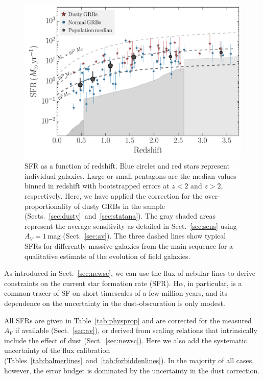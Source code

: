 \documentclass[traditabstract, longauth]{aa}
\newcommand{\ha}{H$\alpha$}
\begin{document}
\begin{figure}
\includegraphics[angle=0, width=0.99\columnwidth]{Figs/SFR_z.pdf}
\caption{SFR as a function of redshift. Blue circles and red stars represent individual galaxies. Large or small pentagons are the median values binned in redshift with bootstrapped errors at $z<2$ and $z>2$, respectively.  {Here, we have applied the correction for the over-proportionality of dusty GRBs in the sample (Sects.~\ref{sec:dusty}~and~\ref{sec:statana})}. The gray shaded areas represent the average sensitivity as detailed in Sect.~\ref{sec:sens} using $A_V=1$\,mag (Sect.~\ref{sec:av}). The three dashed lines show typical SFRs for differently massive galaxies from the main sequence \citep{2014ApJS..214...15S} for a qualitative estimate of the evolution of field galaxies.}
\label{fig:sfrz}
\end{figure}

As introduced in Sect.~\ref{sec:newsc}, we can use the flux of nebular lines to derive constraints on the current star formation rate (SFR). \ha, in particular, is a common tracer of SF on short timescales of a few million years, and its dependence on the uncertainty in the dust-obscuration is only modest. 

All SFRs are given in Table~\ref{tab:physprop} and are corrected for the measured $A_V$ if available (Sect.~\ref{sec:av}), or derived from scaling relations that intrinsically include the effect of dust (Sect.~\ref{sec:newsc}). Here we also add the systematic uncertainty of the flux calibration (Tables~\ref{tab:balmerlines}~and~\ref{tab:forbiddenlines}). In the majority of all cases, however, the error budget is dominated by the uncertainty in the dust correction.
\end{document}
